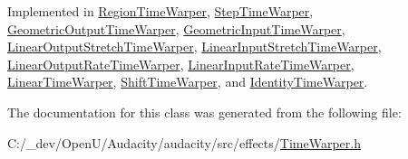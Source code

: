 Implemented in \hyperlink{class_region_time_warper_ae5b65c06bfe9f3517ae1906124224d9d}{Region\+Time\+Warper}, \hyperlink{class_step_time_warper_aad8ca2366905c91d7f5e809115ed3052}{Step\+Time\+Warper}, \hyperlink{class_geometric_output_time_warper_a753407b406acf7775927b62e771f4ad9}{Geometric\+Output\+Time\+Warper}, \hyperlink{class_geometric_input_time_warper_aa0a5547421befe96fd42b2b76aa4a55a}{Geometric\+Input\+Time\+Warper}, \hyperlink{class_linear_output_stretch_time_warper_ad01ef22134b2c6e5eb0d14a920cc2907}{Linear\+Output\+Stretch\+Time\+Warper}, \hyperlink{class_linear_input_stretch_time_warper_a90043df8df79b7638c142b4e046598fa}{Linear\+Input\+Stretch\+Time\+Warper}, \hyperlink{class_linear_output_rate_time_warper_a5b0926127b90c5649ec201d5c0d29036}{Linear\+Output\+Rate\+Time\+Warper}, \hyperlink{class_linear_input_rate_time_warper_ac1077d12f93ed8925b9920009d45fe9b}{Linear\+Input\+Rate\+Time\+Warper}, \hyperlink{class_linear_time_warper_aef575f23fda617c30721ff2fdb2a2f37}{Linear\+Time\+Warper}, \hyperlink{class_shift_time_warper_aa6a42aa3049c47ab5fb98001c4ccbf0c}{Shift\+Time\+Warper}, and \hyperlink{class_identity_time_warper_a132a89ca220726ff167ac7fe0e74c78a}{Identity\+Time\+Warper}.



The documentation for this class was generated from the following file\+:\begin{DoxyCompactItemize}
\item 
C\+:/\+\_\+dev/\+Open\+U/\+Audacity/audacity/src/effects/\hyperlink{_time_warper_8h}{Time\+Warper.\+h}\end{DoxyCompactItemize}

